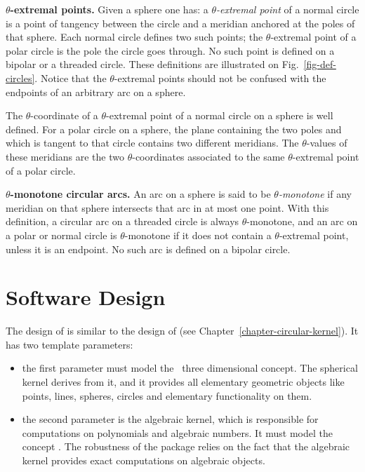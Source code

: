 {\textbf{$\theta$-extremal points.}
Given a sphere one has:
a \textit{$\theta$-extremal point} of a normal circle is a point of
tangency between the circle and a meridian anchored at the poles of
that sphere.  Each normal circle defines two such points;
the $\theta$-extremal point of a polar circle is the pole the circle
goes through.  No such point is defined on a bipolar or a threaded
circle. 
These definitions are illustrated on Fig.~\ref{fig-def-circles}.
Notice that the $\theta$-extremal points should not be confused with
the endpoints of an arbitrary arc on a sphere.

The $\theta$-coordinate of a $\theta$-extremal point of a normal
circle on a sphere is well defined.
For a polar circle on a sphere, the plane containing the two poles and which is
tangent to that circle contains two different meridians. The
$\theta$-values of these meridians are the two $\theta$-coordinates
associated to the same $\theta$-extremal point of a polar circle.

\textbf{$\theta$-monotone circular arcs.}
An arc on a sphere is said to be \textit{$\theta$-monotone} if any meridian
on that sphere intersects that arc in at most one point. With this definition, a
circular arc on a threaded circle is always $\theta$-monotone, and an
arc on a polar or normal circle is $\theta$-monotone if it does not
contain a $\theta$-extremal point, unless it is an endpoint. No such
arc is defined on a bipolar circle.
}%

\section{Software Design}

The design of  is similar to the design of
 (see Chapter~\ref{chapter-circular-kernel}). 
It has two template parameters:
\begin{itemize}
\item {} the first parameter must model the \cgal\ 
three dimensional  concept. The spherical kernel derives
from it, and it provides all elementary geometric objects like points,
lines, spheres, circles and elementary functionality on them.
\item {} the second parameter is the algebraic kernel, which is 
responsible for computations on polynomials and algebraic numbers. It 
must model the concept \ccc{AlgebraicKernelForSpheres}. The
robustness of the package relies on the fact that the algebraic kernel
provides exact computations on algebraic objects.
\end{itemize}

